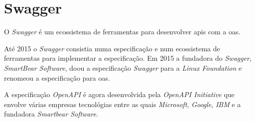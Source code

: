 




\section{Swagger}
O \textit{Swagger} é um ecossistema de ferramentas para desenvolver \acrshort{api}s com a \acrfull{oas}.

Até 2015 o \textit{Swagger} consistia numa especificação e num ecossistema de ferramentas para implementar a especificação. Em 2015 a fundadora do \textit{Swagger}, \textit{SmartBear Software}, doou a especificação \textit{Swagger} para a \textit{Linux Foundation} e renomeou a especificação para \acrlong{oas}.~\cite{wiswagger}

A especificação \textit{OpenAPI} é agora desenvolvida pela \textit{OpenAPI Initiative} que envolve várias empresas tecnológias entre as quais \textit{Microsoft}, \textit{Google}, \textit{IBM} e a fundadora \textit{Smartbear Software}.

